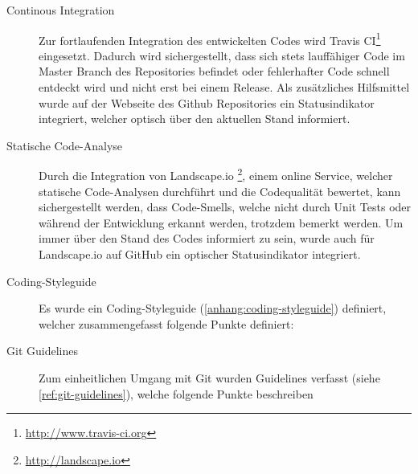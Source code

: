 \begin{description}
	\item[Continous Integration] Zur fortlaufenden Integration des entwickelten
	Codes wird Travis CI\footnote{\url{http://www.travis-ci.org}} eingesetzt.
	Dadurch wird sichergestellt, dass sich stets lauffähiger Code im Master Branch
	des Repositories befindet oder fehlerhafter Code schnell entdeckt wird und
	nicht erst bei einem Release. Als zusätzliches Hilfsmittel wurde auf der
	Webseite des Github Repositories ein Statusindikator integriert, welcher
	optisch über den aktuellen Stand informiert.

	\item[Statische Code-Analyse] Durch die Integration von Landscape.io
	\footnote{\url{http://landscape.io}}, einem online Service, welcher statische
	Code-Analysen durchführt und die Codequalität bewertet, kann sichergestellt
	werden, dass Code-Smells, welche nicht durch Unit Tests oder während der
	Entwicklung erkannt werden, trotzdem bemerkt werden. Um immer über den Stand
	des Codes informiert zu sein, wurde auch für Landscape.io auf GitHub ein
	optischer Statusindikator integriert.

	\item[Coding-Styleguide] Es wurde ein Coding-Styleguide
	(\autoref{anhang:coding-styleguide}) definiert, welcher zusammengefasst folgende
	Punkte definiert:

	\item[Git Guidelines] Zum einheitlichen Umgang mit Git wurden Guidelines
	verfasst (siehe \autoref{ref:git-guidelines}), welche folgende Punkte
	beschreiben

\end{description}
